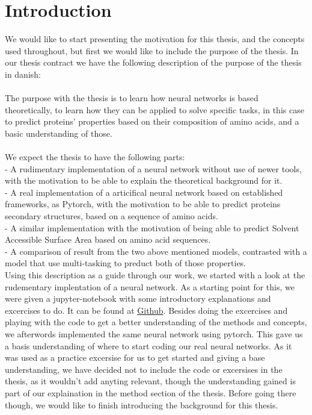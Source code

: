 \section{Introduction}
We would like to start presenting the motivation for this thesis, and the concepts used throughout, but first we would like to include the purpose of the thesis. In our thesis contract we have the following description of the purpose of the thesis in danish:\\\\
The purpose with the thesis is to learn how neural networks is based theoretically, to learn how they can be applied to solve specific tasks, in this case to predict proteins' properties based on their composition of amino acids, and a basic understanding of those. \\\\
We expect the thesis to have the following parts:\\
- A rudimentary implementation of a neural network without use of newer tools, with the motivation to be able to explain the theoretical background for it.\\
- A real implementation of a articifical neural network based on established frameworks, as Pytorch, with the motivation to be able to predict proteins secondary structures, based on a sequence of amino acids. \\
- A similar implementation with the motivation of being able to predict Solvent Accessible Surface Area based on amino acid sequences. \\
- A comparison of result from the two above mentioned models, contrasted with a model that use multi-tasking to preduct both of those properties.\\ 

Using this description as a guide through our work, we started with a look at the rudementary implentation of a neural network. As a starting point for this, we were given a jupyter-notebook with some introductory explanations and excercises to do.
It can be found at \href{https://github.com/dennybritz/nn-from-scratch/blob/master/nn-from-scratch.ipynb}{Github}.
Besides doing the excercises and playing with the code to get a better understanding of the methods and concepts, we afterwords implemented the same neural network using pytorch. 
This gave us a basis understanding of where to start coding our real neural networks. As it was used as a practice excersise for us to get started and giving a base understanding, we have decided not to include the code or excersises in the thesis, as it wouldn't add anyting relevant, though the understanding gained is part of our explaination in the method section of the thesis. Before going there though, we would like to finish introducing the background for this thesis.

